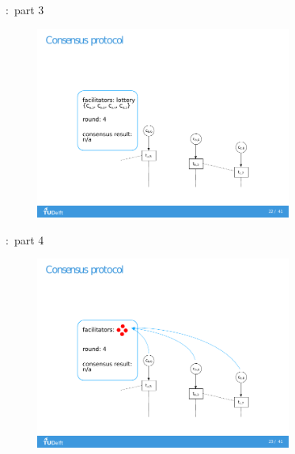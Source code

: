 \documentclass{beamer}
\begin{document}
\begin{frame}{\subsecname:~part 3}
  \begin{figure}[h]
  \includegraphics[trim={2cm 1.5cm 2cm 1.5cm},clip,width=0.75\textwidth]{trustchain-3}
  \centering
  \end{figure}
\end{frame}

\begin{frame}{\subsecname:~part 4}
  \begin{figure}[h]
  \includegraphics[trim={2cm 1.5cm 2cm 1.5cm},clip,width=0.75\textwidth]{trustchain-4}
  \centering
  \end{figure}
\end{frame}
\end{document}
